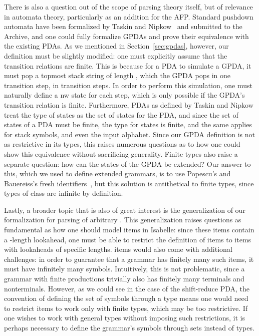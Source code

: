\begin{isabellebody}
\begin{isamarkuptext}
There is also a question out of the scope of parsing theory itself, but of relevance in automata
theory, particularly as an addition for the AFP. Standard pushdown automata have been formalized by
Taskin and Nipkow~\cite{Taskin} and submitted to the Archive, and one could fully formalize GPDAs
and prove their equivalence with the existing PDAs. As we mentioned in Section~\ref{sec:gpdas}, 
however, our definition must be slightly modified: one must explicitly assume that the transition
relations are finite. This is because for a PDA to simulate a GPDA, it must pop a topmost stack
string of length , which the GPDA pops in one transition step, in  transition steps. In order
to perform this simulation, one must naturally define a nw state for each step, which is only
possible if the GPDA's transition relation is finite. Furthermore, PDAs as defined by Taskin and 
Nipkow treat the type of states as the set of states for the PDA, and since the set of states of a 
PDA must be finite, the type for states is finite, and the same applies for stack symbols, and even 
the input alphabet. Since our GPDA definition is not as restrictive in its types, this raises
numerous questions as to how one could show this equivalence without sacrificing generality.
Finite types also raise a separate question: how can the states of the GPDA be extended? Our answer
to this, which we used to define extended grammars, is to use Popescu's and Bauereiss's fresh
identifiers~\cite{Popescu}, but this solution is antithetical to finite types, since types of class
 are infinite by definition.

Lastly, a broader topic that is also of great interest is the generalization of our formalization
for  parsing of arbitrary . This generalization raises questions as fundamental as how one
should model  items in Isabelle: since these items contain a -length lookahead, one must
be able to restrict the definition of  items to items with lookaheads of specific lengths. 
 items would also come with additional challenges: in order to guarantee that a grammar has
finitely many such items, it must have infinitely many symbols. Intuitively, this is not problematic,
since a grammar with finite productions trivially also has finitely many terminals and nonterminals.
However, as we could see in the case of the shift-reduce PDA, the convention of defining the set of
symbols through a type means one would need to restrict  items to work only with finite
types, which may be too restrictive. If one wishes to work with general types without imposing
such restrictions, it is perhaps necessary to define the grammar's symbols through sets instead of
types.


\end{isamarkuptext}
\end{isabellebody}
